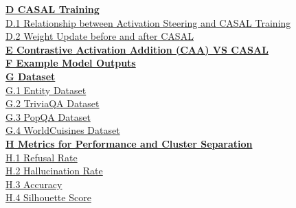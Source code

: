 \documentclass{article} %
\begin{document}
\vspace{0.5em}
\noindent \textbf{\hyperref[app:casal_training]{D \quad CASAL Training}} \dotfill \textbf{\pageref{app:casal_training}} \\
\phantom{D}\quad \hyperref[app:steering_training]{D.1 \quad Relationship between Activation Steering and CASAL Training} \dotfill \pageref{app:steering_training} \\
\phantom{D}\quad \hyperref[app:before_after]{D.2 \quad Weight Update before and after CASAL} \dotfill \pageref{app:before_after} \\

\vspace{0.5em}
\noindent \textbf{\hyperref[app:amortized_optimization]{E \quad Contrastive Activation Addition (CAA) VS CASAL}} \dotfill \textbf{\pageref{app:caa_casal}} \\


\vspace{0.5em}
\noindent \textbf{\hyperref[app:examplePoutput]{F \quad Example Model Outputs}} \dotfill \textbf{\pageref{app:examplePoutput}} \\

\vspace{0.5em}
\noindent \textbf{\hyperref[app:dataset]{G \quad Dataset}} \dotfill \textbf{\pageref{app:dataset}} \\
\phantom{G}\quad \hyperref[app:entity_dataset]{G.1 \quad Entity Dataset} \dotfill \pageref{app:entity_dataset} \\
\phantom{G}\quad \hyperref[app:triviaqa_dataset]{G.2 \quad TriviaQA Dataset} \dotfill \pageref{app:triviaqa_dataset} \\
\phantom{G}\quad \hyperref[app:popqa_dataset]{G.3 \quad PopQA Dataset} \dotfill \pageref{app:popqa_dataset} \\
\phantom{G}\quad \hyperref[app:WorldCuisines_dataset]{G.4 \quad WorldCuisines Dataset} \dotfill \pageref{app:WorldCuisines_dataset} \\

\vspace{0.5em}
\noindent \textbf{\hyperref[app:metric]{H \quad Metrics for Performance and Cluster Separation}} \dotfill \textbf{\pageref{app:metric}} \\
\phantom{H}\quad \hyperref[app:refusal_rate]{H.1 \quad Refusal Rate} \dotfill \pageref{app:refusal_rate} \\
\phantom{H}\quad \hyperref[app:hallucination_rate]{H.2 \quad Hallucination Rate} \dotfill \pageref{app:hallucination_rate} \\
\phantom{H}\quad \hyperref[app:accuracy]{H.3 \quad Accuracy} \dotfill \pageref{app:accuracy} \\
\phantom{H}\quad \hyperref[app:silhouette]{H.4 \quad Silhouette Score} \dotfill \pageref{app:silhouette} \\
\end{document}
